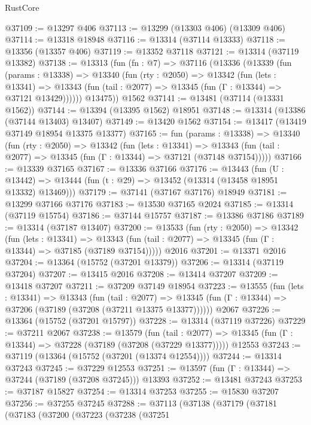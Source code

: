 \begin{lexlean}{RustCore}
\begin{coremodule}
@37109 := @13297 @406
@37113 := @13299 (@13303 @406) (@13309 @406)
@37114 := @13318 @18948
@37116 := @13314 (@37114 @13333)
@37118 := @13356 (@13357 @406)
@37119 := @13352 @37118
@37121 := @13314 (@37119 @13382)
@37138 := @13313
    (fun (fn : @7) =>
    @37116
      (@13336
        (@13339
          (fun (params : @13338) =>
          @13340
            (fun (rty : @2050) =>
            @13342
              (fun (lets : @13341) =>
              @13343 (fun (tail : @2077) => @13345 (fun (Γ : @13344) => @37121 @13429))))))
        @13475))
    @1562
@37141 := @13481 (@37114 (@13331 @1562))
@37144 := @13394 (@13395 @1562) @18951
@37148 := @13314 (@13386 (@37144 @13403) @13407)
@37149 := @13420 @1562
@37154 := @13417 (@13419 @37149 @18954 @13375 @13377)
@37165 := fun (params : @13338) =>
  @13340
    (fun (rty : @2050) =>
    @13342
      (fun (lets : @13341) =>
      @13343 (fun (tail : @2077) => @13345 (fun (Γ : @13344) => @37121 (@37148 @37154)))))
@37166 := @13339 @37165
@37167 := @13336 @37166
@37176 := @13443
    (fun (U : @13442) => @13444 (fun (t : @29) => @13452 (@13314 (@13458 @18951 @13332) @13469)))
@37179 := @37141 (@37167 @37176) @18949
@37181 := @13299 @37166 @37176
@37183 := @13530 @37165 @2024
@37185 := @13314 (@37119 @15754)
@37186 := @37144 @15757
@37187 := @13386 @37186
@37189 := @13314 (@37187 @13407)
@37200 := @13533
    (fun (rty : @2050) =>
    @13342
      (fun (lets : @13341) =>
      @13343 (fun (tail : @2077) => @13345 (fun (Γ : @13344) => @37185 (@37189 @37154)))))
    @2016
@37201 := @13371 @2016
@37204 := @13364 (@15752 (@37201 @13379))
@37206 := @13314 (@37119 @37204)
@37207 := @13415 @2016
@37208 := @13414 @37207
@37209 := @13418 @37207
@37211 := @37209 @37149 @18954
@37223 := @13555
    (fun (lets : @13341) =>
    @13343
      (fun (tail : @2077) =>
      @13345 (fun (Γ : @13344) => @37206 (@37189 (@37208 (@37211 @13375 @13377))))))
    @2067
@37226 := @13364 (@15752 (@37201 @15797))
@37228 := @13314 (@37119 @37226)
@37229 := @37211 @2067
@37238 := @13579
    (fun (tail : @2077) => @13345 (fun (Γ : @13344) => @37228 (@37189 (@37208 (@37229 @13377)))))
    @12553
@37243 := @37119 (@13364 (@15752 (@37201 (@13374 @12554))))
@37244 := @13314 @37243
@37245 := @37229 @12553
@37251 := @13597 (fun (Γ : @13344) => @37244 (@37189 (@37208 @37245))) @13393
@37252 := @13481 @37243
@37253 := @37187 @15827
@37254 := @13314 @37253
@37255 := @15830 @37207
@37256 := @37255 @37245
@37288 := @37113
    (@37138
      (@37179
        (@37181
          (@37183
            (@37200
              (@37223
                (@37238
                  (@37251

\end{coremodule}
\end{lexlean}
